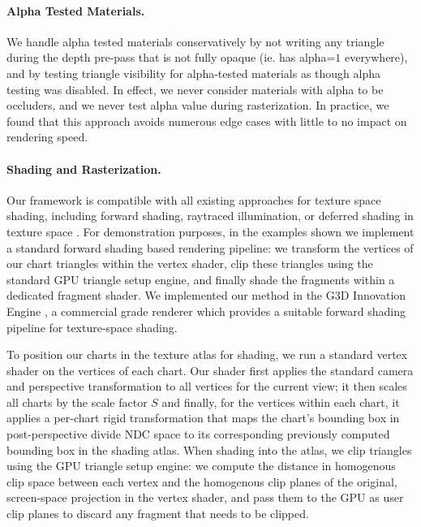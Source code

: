 \paragraph{Alpha Tested Materials.} We handle alpha tested materials conservatively by not writing any triangle during the depth pre-pass that is not fully opaque (ie. has alpha=$1$ everywhere), and by testing triangle visibility for alpha-tested materials as though alpha testing was disabled. In effect, we never consider materials with alpha to be occluders, and we never test alpha value during rasterization. In practice, we found that this approach avoids numerous edge cases with little to no impact on rendering speed. 

\paragraph*{Shading and Rasterization.}

Our framework is compatible with all existing approaches for texture space shading, including forward shading, raytraced illumination, or deferred shading in texture space \cite{baker:2016}. For demonstration purposes, in the examples shown we implement a standard forward shading based rendering pipeline: we transform the vertices of our chart triangles within the vertex shader, clip these triangles using the standard GPU triangle setup engine, and finally shade the fragments within a dedicated fragment shader.  We implemented our method in the G3D Innovation Engine \cite{G3D17}, a commercial grade renderer which provides a suitable forward shading pipeline for texture-space shading. 

To position our charts in the texture atlas for shading, we run a standard vertex shader on the vertices of each chart. Our shader first applies the standard camera and perspective transformation to all vertices for the current view; it then scales all charts by the scale factor $S$ and finally, for the vertices within each chart, it applies a per-chart rigid transformation that maps the chart's bounding box in post-perspective divide NDC space to its corresponding previously computed bounding box in the shading atlas. When shading into the atlas, we clip triangles using the GPU triangle setup engine: we compute the distance in homogenous clip space between each vertex and the homogenous clip planes of the original, screen-space projection in the vertex shader, and pass them to the GPU as user clip planes  to discard any fragment that needs to be clipped. 

